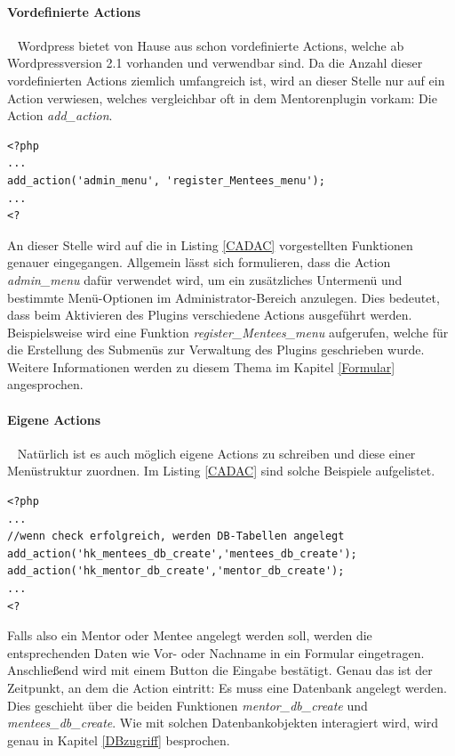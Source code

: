 \paragraph{Vordefinierte Actions}\ \newline
Wordpress bietet von Hause aus schon vordefinierte Actions, welche ab Wordpressversion 2.1 vorhanden und verwendbar sind. Da die Anzahl dieser vordefinierten Actions ziemlich umfangreich ist, wird an dieser Stelle nur auf ein Action verwiesen, welches vergleichbar oft in dem Mentorenplugin vorkam: Die Action \emph{add\_action}.

\begin{lstlisting}
<?php
...
add_action('admin_menu', 'register_Mentees_menu');
...
<?
\end{lstlisting}
An dieser Stelle wird auf die in Listing \ref{CADAC} vorgestellten Funktionen genauer eingegangen. \newline
Allgemein lässt sich formulieren, dass die Action \emph{admin\_menu} dafür verwendet wird, um ein zusätzliches Untermenü und bestimmte Menü-Optionen im Administrator-Bereich anzulegen.
Dies bedeutet, dass beim Aktivieren des Plugins verschiedene Actions ausgeführt werden. Beispielsweise wird eine Funktion \emph{register\_Mentees\_menu} aufgerufen, welche für die Erstellung des Submenüs zur Verwaltung des Plugins geschrieben wurde. \newline
Weitere Informationen werden zu diesem Thema im Kapitel \ref{Formular} angesprochen.

\paragraph{Eigene Actions}\ \newline
Natürlich ist es auch möglich eigene Actions zu schreiben und diese einer Menüstruktur zuordnen. Im Listing \ref{CADAC} sind solche Beispiele aufgelistet.
\begin{lstlisting}
<?php
...
//wenn check erfolgreich, werden DB-Tabellen angelegt
add_action('hk_mentees_db_create','mentees_db_create');
add_action('hk_mentor_db_create','mentor_db_create');
...
<?
\end{lstlisting}
Falls also ein Mentor oder Mentee angelegt werden soll, werden die entsprechenden Daten wie Vor- oder Nachname in ein Formular eingetragen. Anschließend wird mit einem Button die Eingabe bestätigt. Genau das ist der Zeitpunkt, an dem die Action eintritt: Es muss eine Datenbank angelegt werden. Dies geschieht über die beiden Funktionen \emph{mentor\_db\_create} und \emph{mentees\_db\_create}. \newline
Wie mit solchen Datenbankobjekten interagiert wird, wird genau in Kapitel \ref{DBzugriff} besprochen.
